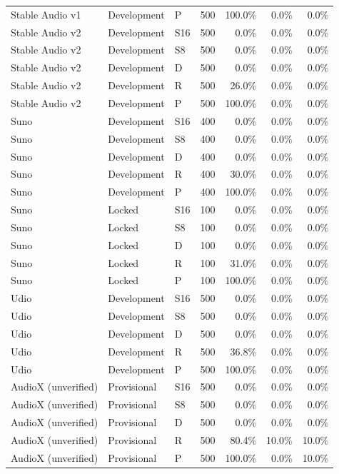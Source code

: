 \begin{longtable}{lllrrrr}
Stable Audio v1 & Development & P & 500 & 100.0\% & 0.0\% & 0.0\% \\
Stable Audio v2 & Development & S16 & 500 & 0.0\% & 0.0\% & 0.0\% \\
Stable Audio v2 & Development & S8 & 500 & 0.0\% & 0.0\% & 0.0\% \\
Stable Audio v2 & Development & D & 500 & 0.0\% & 0.0\% & 0.0\% \\
Stable Audio v2 & Development & R & 500 & 26.0\% & 0.0\% & 0.0\% \\
Stable Audio v2 & Development & P & 500 & 100.0\% & 0.0\% & 0.0\% \\
Suno & Development & S16 & 400 & 0.0\% & 0.0\% & 0.0\% \\
Suno & Development & S8 & 400 & 0.0\% & 0.0\% & 0.0\% \\
Suno & Development & D & 400 & 0.0\% & 0.0\% & 0.0\% \\
Suno & Development & R & 400 & 30.0\% & 0.0\% & 0.0\% \\
Suno & Development & P & 400 & 100.0\% & 0.0\% & 0.0\% \\
Suno & Locked & S16 & 100 & 0.0\% & 0.0\% & 0.0\% \\
Suno & Locked & S8 & 100 & 0.0\% & 0.0\% & 0.0\% \\
Suno & Locked & D & 100 & 0.0\% & 0.0\% & 0.0\% \\
Suno & Locked & R & 100 & 31.0\% & 0.0\% & 0.0\% \\
Suno & Locked & P & 100 & 100.0\% & 0.0\% & 0.0\% \\
Udio & Development & S16 & 500 & 0.0\% & 0.0\% & 0.0\% \\
Udio & Development & S8 & 500 & 0.0\% & 0.0\% & 0.0\% \\
Udio & Development & D & 500 & 0.0\% & 0.0\% & 0.0\% \\
Udio & Development & R & 500 & 36.8\% & 0.0\% & 0.0\% \\
Udio & Development & P & 500 & 100.0\% & 0.0\% & 0.0\% \\
AudioX (unverified) & Provisional & S16 & 500 & 0.0\% & 0.0\% & 0.0\% \\
AudioX (unverified) & Provisional & S8 & 500 & 0.0\% & 0.0\% & 0.0\% \\
AudioX (unverified) & Provisional & D & 500 & 0.0\% & 0.0\% & 0.0\% \\
AudioX (unverified) & Provisional & R & 500 & 80.4\% & 10.0\% & 10.0\% \\
AudioX (unverified) & Provisional & P & 500 & 100.0\% & 0.0\% & 10.0\% \\

\end{longtable}
